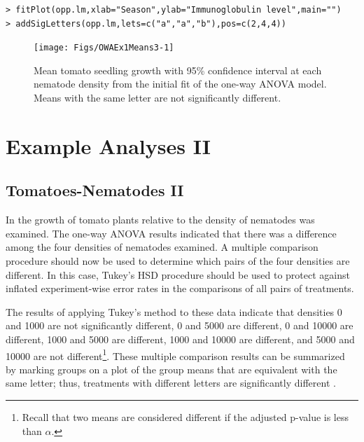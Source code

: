 \documentclass[10pt,openany]{book}\usepackage[]{graphicx}\usepackage[]{color}
\makeatletter
\newenvironment{kframe}{%
 \def\at@end@of@kframe{}%
 \ifinner\ifhmode%
  \def\at@end@of@kframe{\end{minipage}}%
  \begin{minipage}{\columnwidth}%
 \fi\fi%
 \def\FrameCommand##1{\hskip\@totalleftmargin \hskip-\fboxsep
 \colorbox{shadecolor}{##1}\hskip-\fboxsep
     \hskip-\linewidth \hskip-\@totalleftmargin \hskip\columnwidth}%
 \MakeFramed {\advance\hsize-\width
   \@totalleftmargin\z@ \linewidth\hsize
   \@setminipage}}%
 {\par\unskip\endMakeFramed%
 \at@end@of@kframe}
\newenvironment{knitrout}{}{} %
\makeatother
\begin{document}
\begin{knitrout}
\color{fgcolor}\begin{kframe}
\begin{verbatim}
> fitPlot(opp.lm,xlab="Season",ylab="Immunoglobulin level",main="")
> addSigLetters(opp.lm,lets=c("a","a","b"),pos=c(2,4,4))
\end{verbatim}
\end{kframe}\begin{figure}[hbtp]

{\centering \texttt{[image: Figs/OWAEx1Means3-1]} 

}

\caption[Mean tomato seedling growth with 95\% confidence interval at each nematode density from the initial fit of the one-way ANOVA model]{Mean tomato seedling growth with 95\% confidence interval at each nematode density from the initial fit of the one-way ANOVA model.  Means with the same letter are not significantly different.}\label{fig:OWAEx1Means3}
\end{figure}


\end{knitrout}

\section{Example Analyses II}
\subsection{Tomatoes-Nematodes II}
In  the growth of tomato plants relative to the density of nematodes was examined.  The one-way ANOVA results indicated that there was a difference among the four densities of nematodes examined.  A multiple comparison procedure should now be used to determine which pairs of the four densities are different.  In this case, Tukey's HSD procedure should be used to protect against inflated experiment-wise error rates in the comparisons of all pairs of treatments.

The results of applying Tukey's method to these data  indicate that densities 0 and 1000 are not significantly different, 0 and 5000 are different, 0 and 10000 are different, 1000 and 5000 are different, 1000 and 10000 are different, and 5000 and 10000 are not different\footnote{Recall that two means are considered different if the adjusted p-value is less than $\alpha$.}.  These multiple comparison results can be summarized by marking groups on a plot of the group means that are equivalent with the same letter; thus, treatments with different letters are significantly different .
\end{document}
